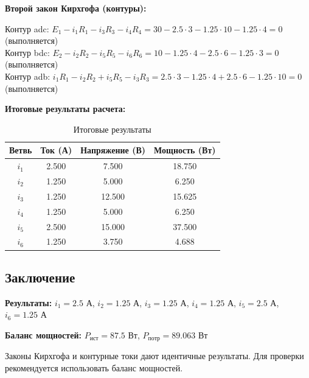 \textbf{Второй закон Кирхгофа (контуры):}
\begin{flushleft}
Контур adc: $E_1 - i_1R_1 - i_3R_3 - i_4R_4 = 30 - 2.5 \cdot 3 - 1.25 \cdot 10 - 1.25 \cdot 4 = 0$ (выполняется) \\
Контур bdc: $E_2 - i_2R_2 - i_5R_5 - i_6R_6 = 10 - 1.25 \cdot 4 - 2.5 \cdot 6 - 1.25 \cdot 3 = 0$ (выполняется) \\
Контур adb: $i_1R_1 - i_2R_2 + i_5R_5 - i_3R_3 = 2.5 \cdot 3 - 1.25 \cdot 4 + 2.5 \cdot 6 - 1.25 \cdot 10 = 0$ (выполняется)
\end{flushleft}

\textbf{Итоговые результаты расчета:}
\begin{table}[H]
\centering
\begin{tabular}{|c|c|c|c|}
\hline
\textbf{Ветвь} & \textbf{Ток (А)} & \textbf{Напряжение (В)} & \textbf{Мощность (Вт)} \\
\hline
$i_1$ & 2.500 & 7.500 & 18.750 \\
\hline
$i_2$ & 1.250 & 5.000 & 6.250 \\
\hline
$i_3$ & 1.250 & 12.500 & 15.625 \\
\hline
$i_4$ & 1.250 & 5.000 & 6.250 \\
\hline
$i_5$ & 2.500 & 15.000 & 37.500 \\
\hline
$i_6$ & 1.250 & 3.750 & 4.688 \\
\hline
\end{tabular}
\caption{Итоговые результаты}
\label{tab:final_results}
\end{table}

\subsection{Заключение}

\textbf{Результаты:} $i_1 = 2.5$ А, $i_2 = 1.25$ А, $i_3 = 1.25$ А, $i_4 = 1.25$ А, $i_5 = 2.5$ А, $i_6 = 1.25$ А

\textbf{Баланс мощностей:} $P_{ист} = 87.5$ Вт, $P_{потр} = 89.063$ Вт

Законы Кирхгофа и контурные токи дают идентичные результаты. Для проверки рекомендуется использовать баланс мощностей.



